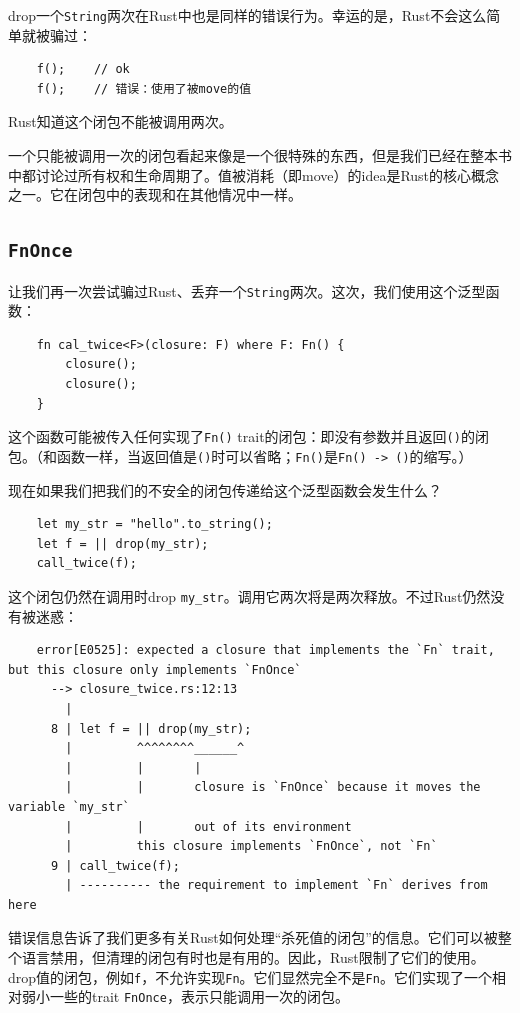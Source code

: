 drop一个\texttt{String}两次在Rust中也是同样的错误行为。幸运的是，Rust不会这么简单就被骗过：
\begin{verbatim}
    f();    // ok
    f();    // 错误：使用了被move的值
\end{verbatim}

Rust知道这个闭包不能被调用两次。

一个只能被调用一次的闭包看起来像是一个很特殊的东西，但是我们已经在整本书中都讨论过所有权和生命周期了。值被消耗（即move）的idea是Rust的核心概念之一。它在闭包中的表现和在其他情况中一样。

\subsection{\texttt{FnOnce}}
让我们再一次尝试骗过Rust、丢弃一个\texttt{String}两次。这次，我们使用这个泛型函数：
\begin{verbatim}
    fn cal_twice<F>(closure: F) where F: Fn() {
        closure();
        closure();
    }
\end{verbatim}

这个函数可能被传入任何实现了\texttt{Fn()} trait的闭包：即没有参数并且返回\texttt{()}的闭包。（和函数一样，当返回值是\texttt{()}时可以省略；\texttt{Fn()}是\texttt{Fn() -> ()}的缩写。）

现在如果我们把我们的不安全的闭包传递给这个泛型函数会发生什么？
\begin{verbatim}
    let my_str = "hello".to_string();
    let f = || drop(my_str);
    call_twice(f);
\end{verbatim}

这个闭包仍然在调用时drop \texttt{my\_str}。调用它两次将是两次释放。不过Rust仍然没有被迷惑：
\begin{verbatim}
    error[E0525]: expected a closure that implements the `Fn` trait, but this closure only implements `FnOnce`
      --> closure_twice.rs:12:13
        |
      8 | let f = || drop(my_str);
        |         ^^^^^^^^______^
        |         |       |
        |         |       closure is `FnOnce` because it moves the variable `my_str`
        |         |       out of its environment
        |         this closure implements `FnOnce`, not `Fn`
      9 | call_twice(f);
        | ---------- the requirement to implement `Fn` derives from here
\end{verbatim}

错误信息告诉了我们更多有关Rust如何处理“杀死值的闭包”的信息。它们可以被整个语言禁用，但清理的闭包有时也是有用的。因此，Rust限制了它们的使用。drop值的闭包，例如\texttt{f}，不允许实现\texttt{Fn}。它们显然完全不是\texttt{Fn}。它们实现了一个相对弱小一些的trait \texttt{FnOnce}，表示只能调用一次的闭包。

